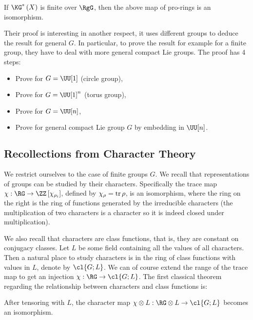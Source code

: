 \begin{theorem}[{\cite{AS}}]
	If $\KG^*\left(X\right)$ is finite over $\RgG$, then the above map of pro-rings is an isomorphism.
\end{theorem}

Their proof is interesting in another respect, it uses different groups to deduce the result for general $G$.
In particular, to prove the result for example for a finite group, they have to deal with more general compact Lie groups.
The proof has 4 steps:
\begin{itemize}
	\item Prove for $G = \UU[1]$ (circle group),
	\item Prove for $G = \UU[1]^n$ (torus group),
	\item Prove for $G = \UU[n]$,
	\item Prove for general compact Lie group $G$ by embedding in $\UU[n]$.
\end{itemize}



\subsection{Recollections from Character Theory}

We restrict ourselves to the case of finite groups $G$.
We recall that representations of groups can be studied by their characters.
Specifically the trace map $\chi: \RG \to \ZZ\left[\chi_{\rho_i}\right]$, defined by $\chi_\rho = \operatorname{tr} \rho$, is an isomorphism, where the ring on the right is the ring of functions generated by the irreducible characters (the multiplication of two characters is a character so it is indeed closed under multiplication).

We also recall that characters are class functions, that is, they are constant on conjugacy classes.
Let $L$ be some field containing all the values of all characters.
Then a natural place to study characters is in the ring of class functions with values in $L$, denote by $\cl{G;L}$.
We can of course extend the range of the trace map to get an injection $\chi: \RG \to \cl{G;L}$.
The first classical theorem regarding the relationship between characters and class functions is:

\begin{theorem}\label{char-1}
	After tensoring with $L$, the character map $\chi \otimes L: \RG \otimes L \to \cl{G; L}$ becomes an isomorphism.
\end{theorem}

